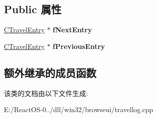 \subsection*{Public 属性}
\begin{DoxyCompactItemize}
\item 
\mbox{\label{class_c_travel_entry_ac882c81c148d0e5049363f7942cccb84}} 
\hyperlink{class_c_travel_entry}{C\+Travel\+Entry} $\ast$ {\bfseries f\+Next\+Entry}
\item 
\mbox{\label{class_c_travel_entry_af8d2e59149d31aed55c973d662bcc2fb}} 
\hyperlink{class_c_travel_entry}{C\+Travel\+Entry} $\ast$ {\bfseries f\+Previous\+Entry}
\end{DoxyCompactItemize}
\subsection*{额外继承的成员函数}


该类的文档由以下文件生成\+:\begin{DoxyCompactItemize}
\item 
E\+:/\+React\+O\+S-\/0../dll/win32/browseui/travellog.\+cpp\end{DoxyCompactItemize}
